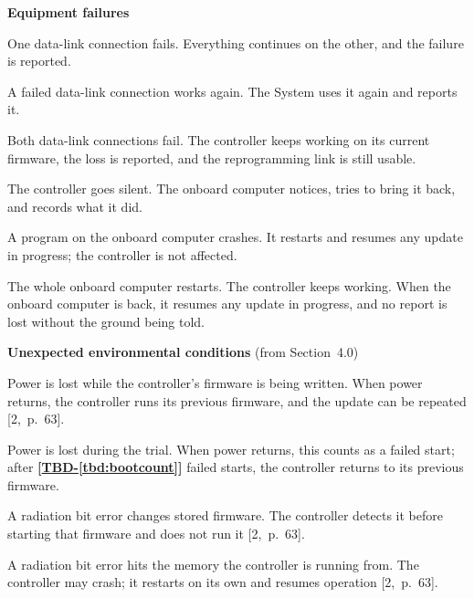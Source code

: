 \documentclass[11pt,a4paper]{article}
\newcommand{\tbd}[1]{\mbox{\textbf{[\hyperref[tbd:#1]{TBD-\ref*{tbd:#1}}]}}}
\begin{document}
\medskip
{}
\noindent\textbf{Equipment failures}
\begin{description}[leftmargin=3cm]
\item[Scenario-500] One data-link connection fails. Everything continues on the
  other, and the failure is reported.
\item[Scenario-505] A failed data-link connection works again. The System uses
  it again and reports it.
\item[Scenario-510] Both data-link connections fail. The controller keeps
  working on its current firmware, the loss is reported, and the
  reprogramming link is still usable.
\item[Scenario-520] The controller goes silent. The onboard computer notices,
  tries to bring it back, and records what it did.
\item[Scenario-530] A program on the onboard computer crashes. It restarts and
  resumes any update in progress; the controller is not affected.
\item[Scenario-535] The whole onboard computer restarts. The controller keeps
  working. When the onboard computer is back, it resumes any update in
  progress, and no report is lost without the ground being told.
\end{description}

\medskip
{}
\noindent\textbf{Unexpected environmental conditions} (from Section~4.0)
\begin{description}[leftmargin=3cm]
\item[Scenario-600] Power is lost while the controller's firmware is being
  written. When power returns, the controller runs its previous firmware, and
  the update can be repeated [2,~p.~63].
\item[Scenario-605] Power is lost during the trial. When power returns, this
  counts as a failed start; after \tbd{bootcount} failed starts, the controller
  returns to its previous firmware.
\item[Scenario-610] A radiation bit error changes stored firmware. The
  controller detects it before starting that firmware and does not run it [2,~p.~63].
\item[Scenario-620] A radiation bit error hits the memory the controller is
  running from. The controller may crash; it restarts on its own and resumes
  operation [2,~p.~63].
\end{description}

\end{document}
